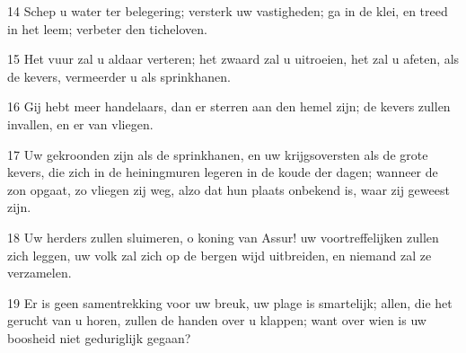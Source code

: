 \par 14 Schep u water ter belegering; versterk uw vastigheden; ga in de klei, en treed in het leem; verbeter den ticheloven.
\par 15 Het vuur zal u aldaar verteren; het zwaard zal u uitroeien, het zal u afeten, als de kevers, vermeerder u als sprinkhanen.
\par 16 Gij hebt meer handelaars, dan er sterren aan den hemel zijn; de kevers zullen invallen, en er van vliegen.
\par 17 Uw gekroonden zijn als de sprinkhanen, en uw krijgsoversten als de grote kevers, die zich in de heiningmuren legeren in de koude der dagen; wanneer de zon opgaat, zo vliegen zij weg, alzo dat hun plaats onbekend is, waar zij geweest zijn.
\par 18 Uw herders zullen sluimeren, o koning van Assur! uw voortreffelijken zullen zich leggen, uw volk zal zich op de bergen wijd uitbreiden, en niemand zal ze verzamelen.
\par 19 Er is geen samentrekking voor uw breuk, uw plage is smartelijk; allen, die het gerucht van u horen, zullen de handen over u klappen; want over wien is uw boosheid niet geduriglijk gegaan?




